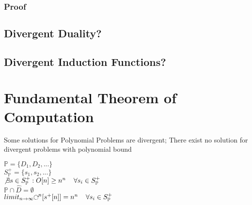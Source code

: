 \documentclass[11pt]{article}
\def \nestedloop {\ensuremath{\rotatebox[origin=c]{-90}{$\circlearrowright$}}^n}
\begin{document}
\subsubsection{Proof}








\subsection{Divergent Duality?}
\subsection{Divergent Induction Functions?}









\newpage
\section{Fundamental Theorem of Computation}
Some solutions for Polynomial Problems are divergent; There exist no solution for divergent problems with polynomial bound
\begin{center}
$
\mathbb{P} = \{D_1,D_2,...\}
$
\\ \vspace{2mm}
$
S^+_{\mathbb{P}} = \{s_1,s_2,...\}
$
\\ \vspace{2mm}
$
\not \exists s \in S^+_{\mathbb{P}} : O[n] \geq n^n \hspace{4mm} \forall s_i \in S^+_{\mathbb{P}} 
$
\\ \vspace{2mm}
$
\mathbb{P} \cap \hat{D} = \emptyset
$
\\ \vspace{6mm}
$
limit_{n \rightarrow \infty} \nestedloop [s^+[n]] = n^n  \hspace{4mm} \forall s_i \in S^+_{\mathbb{P}} 
$
\end{center}
\end{document}
